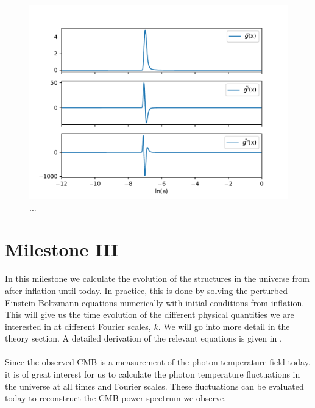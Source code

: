 \documentclass{aa}
\begin{document}
\begin{figure}[h!]
   \includegraphics[scale=0.5]{Figures/M2_gtilde.pdf}
   \caption{...}\label{fig:M2_gtilde}
\end{figure}









\section{Milestone III}
In this milestone we calculate the evolution of the structures in the universe from after inflation until today.  In practice, this is done by 
solving the perturbed Einstein-Boltzmann equations numerically with initial conditions from inflation. This will give us the time evolution of the different physical quantities we are interested
in at different Fourier scales, $k$. We will go into more detail in the theory section. A detailed derivation of the relevant equations is given in \cite{winther:2023}. \\
\\
Since the observed CMB is a measurement of the photon temperature field today, it is of great interest for us to calculate the photon temperature fluctuations 
in the universe at all times and Fourier scales. These fluctuations can be evaluated today to reconstruct the CMB power spectrum we observe. 
\end{document}
